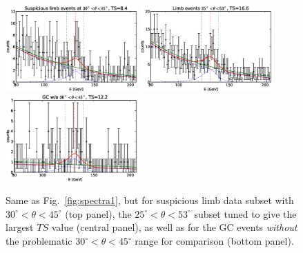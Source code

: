 \documentclass[aps,twocolumn,prd,superscriptaddress,showpacs,nofootinbib,fixfloat]{revtex4}
\begin{document}
\begin{figure}
  \centering
  \includegraphics[width=0.45\textwidth]{plots/counts_suspiciousLimb.eps}
  \includegraphics[width=0.45\textwidth]{plots/counts_suspiciousLimb_tuned.eps}
  \includegraphics[width=0.45\textwidth]{plots/counts_GC_wo3045.eps}
  \caption{Same as Fig.~\ref{fig:spectra1}, but for
  suspicious limb data subset with
  $30^\circ<\theta<45^\circ$ (top panel),
  the $25^\circ<\theta<53^\circ$ subset tuned to give the largest $TS$ value (central panel),
  as well as for the
  GC events \emph{without} the problematic
  $30^\circ<\theta<45^\circ$ range for comparison (bottom panel).}
  \label{fig:spectra2}
\end{figure}
\end{document}
